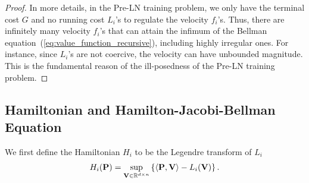 \documentclass[journal]{IEEEtran}
\def\eqref#1{equation~\ref{#1}}
\newcommand{\bfP}{{\bf P}}
\newcommand{\bfV}{{\bf V}}
\newcommand{\bfX}{{\bf X}}
\newcommand{\bfy}{ {\bf y}}
\renewcommand{\eqref}[1]{(\ref{#1})}
\theoremstyle{plain}
\theoremstyle{definition}
\theoremstyle{remark}
\begin{document}
\begin{proof}
    In more details, in the Pre-LN training problem, we only have the terminal cost $G$ and no running cost $L_i$'s to regulate the  velocity $f_i$'s. Thus, there are infinitely many velocity $f_i$'s that can attain the infimum of the Bellman equation~\eqref{eq:value_function_recursive}, including highly irregular ones. For instance, since $L_i$'s are not coercive, the velocity can have unbounded magnitude. This is the fundamental reason of the ill-posedness of the Pre-LN training problem.
\end{proof}




\subsection{Hamiltonian and Hamilton-Jacobi-Bellman Equation}
We first define the Hamiltonian $H_i$ to be the Legendre transform of $L_i$
\begin{equation}\label{eq:generic_Hamiltonian_appendix}
    H_i(\bfP) = \sup_{\bfV \in \mathbb{R}^{d \times n}} \left\{ \langle \bfP, \bfV \rangle - L_i(\bfV) \right\}.
\end{equation}
\end{document}
